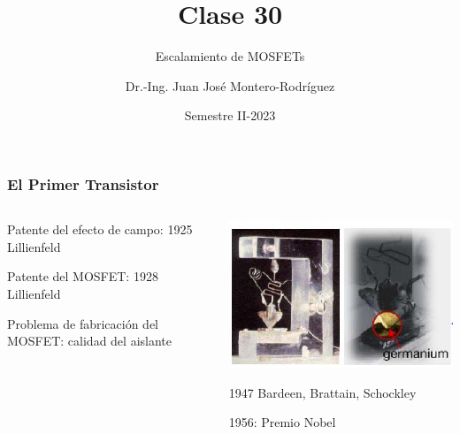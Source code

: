 \documentclass[t,aspectratio=169,10pt]{beamer}
\title{Clase 30}
\subtitle{Escalamiento de MOSFETs}
\author{Dr.-Ing. Juan José Montero-Rodríguez}
\institute{Escuela de Ingeniería Electrónica}
\date{Semestre II-2023}
\begin{document}
\begin{frame}
\titlepage
\end{frame}


\begin{frame}
\frametitle{El Primer Transistor}

\begin{columns}

\begin{column}{0.5\textwidth}

	Patente del efecto de campo: 1925 Lillienfeld
	
	\vspace{3mm}
	Patente del MOSFET: 1928 Lillienfeld
	
	\vspace{3mm}
	Problema de fabricación del MOSFET: calidad del aislante
 
\end{column}

\begin{column}{0.5\textwidth}

	\includegraphics[width=\textwidth]{first-transistor}
	
	1947 Bardeen, Brattain, Schockley
	
	1956: Premio Nobel
 
\end{column}

\end{columns}

\end{frame}
\end{document}

